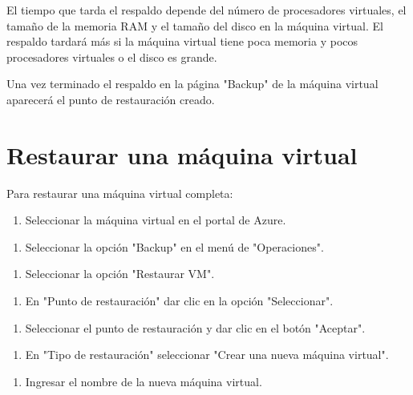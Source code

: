 El tiempo que tarda el respaldo depende del número de procesadores virtuales, el tamaño de la memoria RAM y el tamaño del disco en la máquina virtual. El respaldo tardará más si la máquina virtual tiene poca memoria y pocos procesadores virtuales o el disco es grande.

Una vez terminado el respaldo en la página "Backup" de la máquina virtual aparecerá el punto de restauración creado.

\section{Restaurar una máquina virtual}

Para restaurar una máquina virtual completa:

\begin{enumerate}
\item Seleccionar la máquina virtual en el portal de Azure.
\end{enumerate}

\begin{enumerate}
\item Seleccionar la opción "Backup" en el menú de "Operaciones".
\end{enumerate}

\begin{enumerate}
\item Seleccionar la opción "Restaurar VM".
\end{enumerate}

\begin{enumerate}
\item En "Punto de restauración" dar clic en la opción "Seleccionar".
\end{enumerate}

\begin{enumerate}
\item Seleccionar el punto de restauración y dar clic en el botón "Aceptar".
\end{enumerate}

\begin{enumerate}
\item En "Tipo de restauración" seleccionar "Crear una nueva máquina virtual".
\end{enumerate}

\begin{enumerate}
\item Ingresar el nombre de la nueva máquina virtual.
\end{enumerate}

